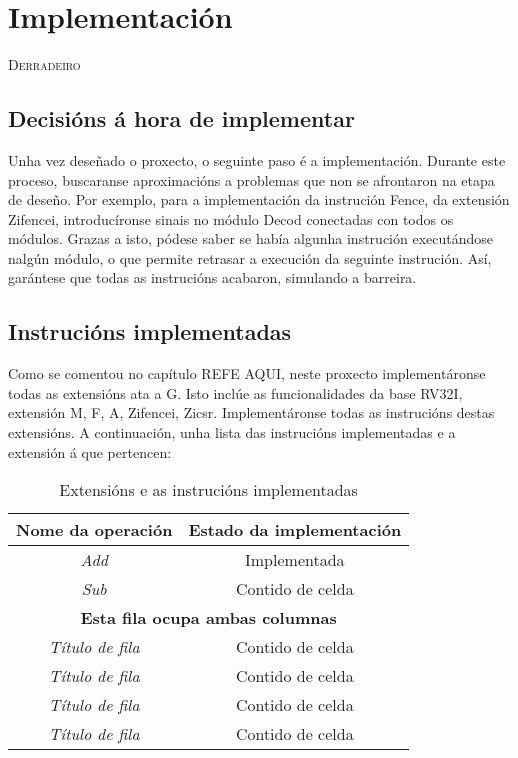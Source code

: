 \chapter{Implementación}
\label{chap:implementacion}

\lettrine{D}{erradeiro} 

\section{Decisións á hora de implementar}\label{sec:decisions}
Unha vez deseñado o proxecto, o seguinte paso é a implementación. Durante este proceso, buscaranse aproximacións a problemas que non se afrontaron na etapa de deseño. Por exemplo, para a implementación da instrución Fence, da extensión Zifencei, introducíronse sinais no módulo Decod conectadas con todos os módulos. Grazas a isto, pódese saber se había algunha instrución executándose nalgún módulo, o que permite retrasar a execución da seguinte instrución. Así, garántese que todas as instrucións acabaron, simulando a barreira.


\section{Instrucións implementadas}\label{sec:intrucions_implt}
Como se comentou no capítulo REFE AQUI, neste proxecto implementáronse todas as extensións ata a G. Isto inclúe as funcionalidades da base RV32I, extensión M, F, A, Zifencei, Zicsr. Implementáronse todas as instrucións destas extensións. A continuación, unha lista das instrucións implementadas e a extensión á que pertencen:
\begin{table}[hp!]
  \centering
  \begin{tabular}{c|c}
    \rowcolor{udcpink!25}
    \textbf{Nome da operación} & \textbf{Estado da implementación} \\\hline
    \textit{Add} & Implementada \\
    \textit{Sub} & Contido de celda \\
    \multicolumn{2}{c}{\textbf{Esta fila ocupa ambas columnas}} \\
    \textit{Título de fila} & Contido de celda \\
    \textit{Título de fila} & Contido de celda \\
    \textit{Título de fila} & Contido de celda \\
    \textit{Título de fila} & Contido de celda \\
  \end{tabular}
  \caption{Extensións e as instrucións implementadas}
  \label{tab:intrucions_implementadas}
\end{table}


